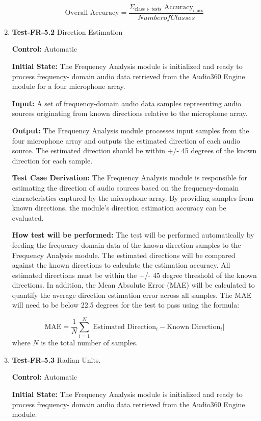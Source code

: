 \documentclass[12pt, titlepage]{article}
\begin{document}
\begin{enumerate}
\[
\text{Overall Accuracy} = \frac{\Sigma_{\text{class } \in \text{  tests}} 
\text{      Accuracy}_{\text{class}}}{Number of Classes}
\]

\item{\textbf{Test-FR-5.2} Direction Estimation\\}

\textbf{Control:} Automatic

\textbf{Initial State:}
The Frequency Analysis module is initialized and ready to process frequency-
domain audio data retrieved from the Audio360 Engine module for a four
microphone array.

\textbf{Input:}
A set of frequency-domain audio data samples representing audio sources
originating from known directions relative to the microphone array.

\textbf{Output:}
The Frequency Analysis module processes input samples from the four microphone
array and outputs the estimated direction of each audio source. The estimated
direction should be within +/- 45 degrees of the known direction for each
sample.

\textbf{Test Case Derivation:}
The Frequency Analysis module is responsible for estimating the direction of
audio sources based on the frequency-domain characteristics captured by the
microphone array. By providing samples from known directions, the module's
direction estimation accuracy can be evaluated.

\textbf{How test will be performed:}
The test will be performed automatically by feeding the frequency domain data of
the known direction samples to the Frequency Analysis module. The estimated
directions will be compared against the known directions to calculate the
estimation accuracy. All estimated directions must be within the +/- 45 degree
threshold of the known directions. In addition, the Mean Absolute Error (MAE)
will be calculated to quantify the average direction estimation error across all
samples. The MAE will need to be below 22.5 degrees for the test to pass using
the formula:

\[
\text{MAE} = \frac{1}{N} \sum_{i=1}^{N} | \text{Estimated Direction}_i - 
\text{Known Direction}_i |
\]
where \(N\) is the total number of samples.

\item{\textbf{Test-FR-5.3} Radian Units.\\}

\textbf{Control:} Automatic

\textbf{Initial State:}
The Frequency Analysis module is initialized and ready to process frequency-
domain audio data retrieved from the Audio360 Engine module.


\end{enumerate}
\end{document}
